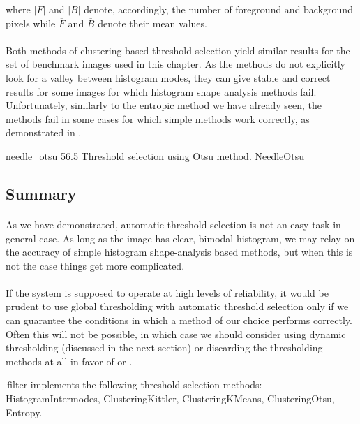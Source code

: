 where $|F|$ and $|B|$ denote, accordingly, the number of foreground and background pixels while $\overline{F}$ and $\overline{B}$ denote their mean values.

\paragraph*{}
Both methods of clustering-based threshold selection yield similar results for the set of benchmark images used in this chapter. As the methods do not explicitly look for a valley between histogram modes, they can give stable and correct results for some images for which histogram shape analysis methods fail. Unfortunately, similarly to the entropic method we have already seen, the methods fail in some cases for which simple methods work correctly, as demonstrated in .

\thresholdFigure
{needle_otsu}
{56.5}
{Threshold selection using Otsu method.}
{NeedleOtsu}

\subsection{Summary}

\paragraph*{}
As we have demonstrated, automatic threshold selection is not an easy task in general case. As long as the image has clear, bimodal histogram, we may relay on the accuracy of simple histogram shape-analysis based methods, but when this is not the case things get more complicated. 

\paragraph*{}
If the system is supposed to operate at high levels of reliability, it would be prudent to use global thresholding with automatic threshold selection only if we can guarantee the conditions in which a method of our choice performs correctly. Often this will not be possible, in which case we should consider using dynamic thresholding (discussed in the next section) or discarding the thresholding methods at all in favor of  or .

\begin{refImpl}
\studio \,filter  implements the following threshold selection methods: HistogramIntermodes, ClusteringKittler, ClusteringKMeans, ClusteringOtsu, Entropy. 
\end{refImpl}

